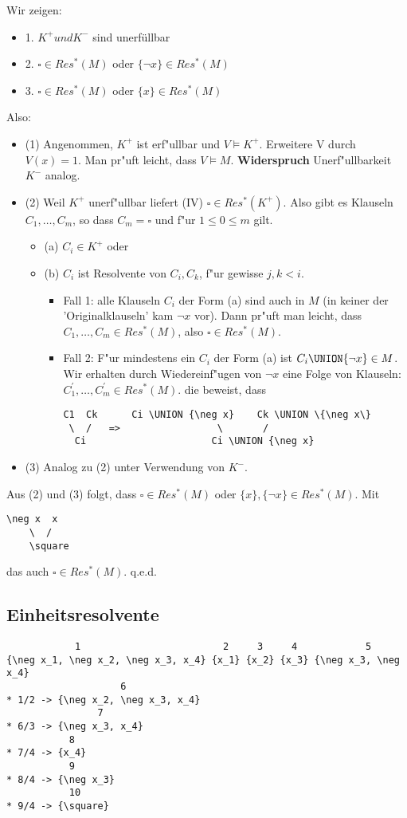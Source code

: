 Wir zeigen:
\begin{itemize}
\item 1. $K^+ und K^-$ sind unerfüllbar \\
\item 2. $\square \in Res^*(M)$ oder $\{\neg x\} \in Res^*(M)$ \\
\item 3. $\square \in Res^*(M)$ oder $\{ x\} \in Res^*(M)$
\end{itemize}
Also:
\begin{itemize}
\item (1) Angenommen, $K^+$ ist erf"ullbar und $V \models K^+$. Erweitere V durch $V(x)=1$. Man pr"uft leicht, dass $V \models M$. \textbf{Widerspruch} Unerf"ullbarkeit $K^-$ analog.
\item (2) Weil $K^+$ unerf"ullbar liefert (IV) $\square \in Res^*(K^+)$. Also gibt es Klauseln $C_1,\dots,C_m$, so dass $C_m = \square$ und f"ur $1 \leq 0 \leq m$ gilt.
\begin{itemize}
    \item (a) $C_i \in K^+$ oder
    \item (b) $C_i$ ist Resolvente von $C_i, C_k$, f"ur gewisse $j, k < i$.
\begin{itemize}
        \item Fall 1: alle Klauseln $C_i$ der Form (a) sind auch in $M$ (in keiner der 'Originalklauseln' kam $\neg x$ vor). Dann pr"uft man leicht, dass $C_1,\dots,C_m \in Res^*(M)$, also $\square \in Res^*(M)$. \\
        \item Fall 2: F"ur mindestens ein $C_i$ der Form (a) ist $C_i \UNION \{\neg x\} \in M$. Wir erhalten durch Wiedereinf"ugen von $\neg x$ eine Folge von Klauseln:
$C^{'}_1,\dots,C^{'}_m \in Res^*(M)$.
die beweist, dass
\begin{verbatim}
C1  Ck      Ci \UNION {\neg x}    Ck \UNION \{\neg x\}
 \  /   =>                 \       /
  Ci                      Ci \UNION {\neg x}
\end{verbatim}
\end{itemize}
\end{itemize}
\item (3) Analog zu (2) unter Verwendung von $K^-$.
\end{itemize}
Aus (2) und (3) folgt, dass $\square \in Res^*(M)$ oder $\{x\}, \{\neg x\} \in Res^*(M)$. Mit
\begin{verbatim}
\neg x  x     
    \  /   
    \square
\end{verbatim}
das auch $\square \in Res^*(M)$. q.e.d.

\subsection{Einheitsresolvente}
\begin{verbatim}
            1                         2     3     4            5
{\neg x_1, \neg x_2, \neg x_3, x_4} {x_1} {x_2} {x_3} {\neg x_3, \neg x_4}
                    6
* 1/2 -> {\neg x_2, \neg x_3, x_4}
                7
* 6/3 -> {\neg x_3, x_4}
           8
* 7/4 -> {x_4}
           9
* 8/4 -> {\neg x_3}
           10
* 9/4 -> {\square}
\end{verbatim}



